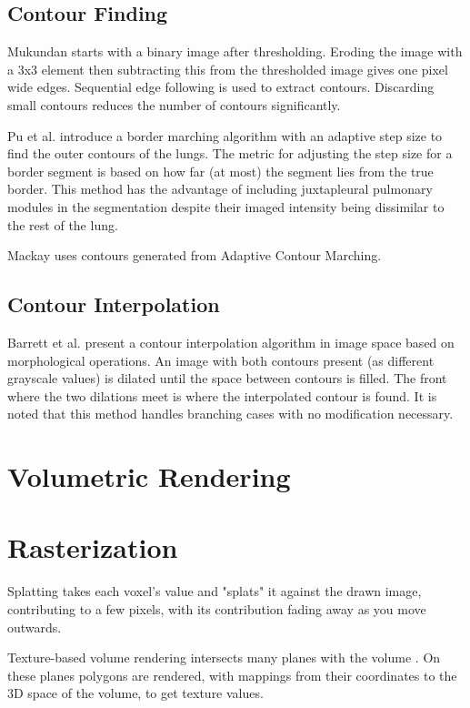 \documentclass[acmsmall, 12pt]{acmart}
\begin{document}
\subsection{Contour Finding}

Mukundan \cite{mukundan2016reconstruction} starts with a binary image after thresholding. Eroding the image with a 3x3 element then subtracting this from the thresholded image gives one pixel wide edges. Sequential edge following is used to extract contours. Discarding small contours reduces the number of contours significantly.

Pu et al. \cite{pu2008adaptive} introduce a border marching algorithm with an adaptive step size to find the outer contours of the lungs. The metric for adjusting the step size for a border segment is based on how far (at most) the segment lies from the true border. This method has the advantage of including juxtapleural pulmonary modules in the segmentation despite their imaged intensity being dissimilar to the rest of the lung.

Mackay \cite{mackay2019robust} uses contours generated from Adaptive Contour Marching.

\subsection{Contour Interpolation}

Barrett et al. \cite{barrett1994image} present a contour interpolation algorithm in image space based on morphological operations. An image with both contours present (as different grayscale values) is dilated until the space between contours is filled. The front where the two dilations meet is where the interpolated contour is found. It is noted that this method handles branching cases with no modification necessary.

\section{Volumetric Rendering}


\section{Rasterization}

Splatting takes each voxel's value and "splats" it against the drawn image, contributing to a few pixels, with its contribution fading away as you move outwards.

Texture-based volume rendering intersects many planes with the volume \cite{ohiotexture}. On these planes polygons are rendered, with mappings from their coordinates to the 3D space of the volume, to get texture values. 
\end{document}
